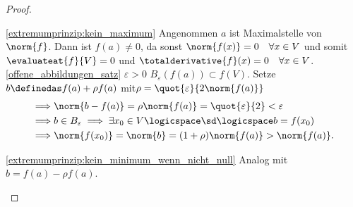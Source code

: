\begin{proof}
  \begin{proofdescription}
    \item[\ref{extremumprinzip:kein_maximum}] Angenommen \( a \) ist Maximalstelle von \( \norm{f} \). Dann ist \( f(a)\neq 0 \), da sonst \( \norm{f(x)}=0\quad \forall x\in V \) und somit \( \evaluateat{f}{V}=0 \) und \( \totalderivative{f}(x)=0\quad \forall x\in V \). \ref{offene_abbildungen_satz} \timplies \texists  \( \varepsilon>0 \) \sd \( B_{\varepsilon}(f(a))\subset f(V) \). Setze \( b\definedas f(a)+\rho f(a) \) mit\( \rho=\quot{\varepsilon}{2\norm{f(a)}} \) 
    \begin{align*}
      \implies &\norm{b-f(a)}=\rho\norm{f(a)}=\quot{\varepsilon}{2}<\varepsilon\\
      \implies &b\in B_{\varepsilon}\implies \exists x_0\in V  \logicspace \text{\sd}\logicspace b=f(x_0)\\
      \implies &\norm{f(x_0)}=\norm{b}=(1+\rho)\norm{f(a)}>\norm{f(a)}.
    \end{align*}
    \item[\ref{extremumprinzip:kein_minimum_wenn_nicht_null}] Analog mit \( b=f(a)-\rho f(a) \).
  \end{proofdescription}
  
\end{proof}
